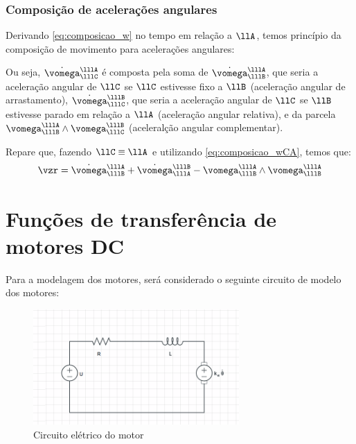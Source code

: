 \documentclass[]{politex}
\newcommand*\mybluebox[1]{%
\colorbox{myblue}{\hspace{1em}#1\hspace{1em}}}
\newcommand*\almondbox[1]{%
\colorbox{almond}{\hspace{1em}#1\hspace{1em}}}
\begin{document}
\subsection{Composição de acelerações angulares}\label{S05-01-03-05}

Derivando \eqref{eq:composicao_w} no tempo em relação a $\llA$, temos princípio da composição de movimento para acelerações angulares:

Ou seja, $\dot{\vomega}_{\lllC}^{\lllA}$ é composta pela soma de $\dot{\vomega}_{\lllB}^{\lllA}$, que seria a aceleração angular  de $\llC$ se $\llC$ estivesse fixo a $\llB$ (aceleração angular de arrastamento), $\dot{\vomega}_{\lllC}^{\lllB}$, que seria a aceleração angular de $\llC$ se $\llB$ estivesse parado em relação a $\llA$ (aceleração angular relativa), e da parcela $\vomega_{\lllB}^{\lllA} \wedge \vomega_{\lllC}^{\lllB}$ (aceleralção angular complementar).

Repare que, fazendo $\llC \equiv \llA$ e utilizando \eqref{eq:composicao_wCA}, temos que:
\begin{equation}
\vzr =  \dot{\vomega}_{\lllB}^{\lllA}   + \dot{\vomega}_{\lllA}^{\lllB} - \vomega_{\lllB}^{\lllA} \wedge \vomega_{\lllB}^{\lllA}
\end{equation}

\chapter{Funções de transferência de motores DC} \label{apendiceB}

Para a modelagem dos motores, será considerado o seguinte circuito de modelo dos motores:


\begin{figure}[!h]
     \centering
     \includegraphics[width=0.7\textwidth]{imagens/CircuitoMotor.png}
     \caption{Circuito elétrico do motor}
     \label{CEM1}
\end{figure}
\end{document}
